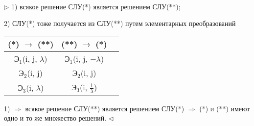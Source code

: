 $\rhd$ 1) всякое решение СЛУ(*) является решением СЛУ(**);

2) СЛУ(*) тоже получается из СЛУ(**) путем элементарных преобразований

\begin{table}[!ht]
	\begin{center}
		\begin{tabular}{c|c|c}
    	(*) $\rightarrow$ (**) & (**) $\rightarrow$ (*) \\
        \hline
        $Э_1$(i, j, $\lambda$) & $Э_1$(i, j, $-\lambda$)\\
        $Э_2$(i, j) & $Э_2$(i, j)\\
        $Э_3$(i, $\lambda$) & $Э_3$(i, $\frac{1}{\lambda}$)
		\end{tabular}
	\end{center}
\end{table}

\vspace{\baselineskip}
1) $\Rightarrow$ всякое решение СЛУ(**) является решением СЛУ(*) $\Rightarrow$ (*) и (**) имеют одно и то же множество решений. $\lhd$

